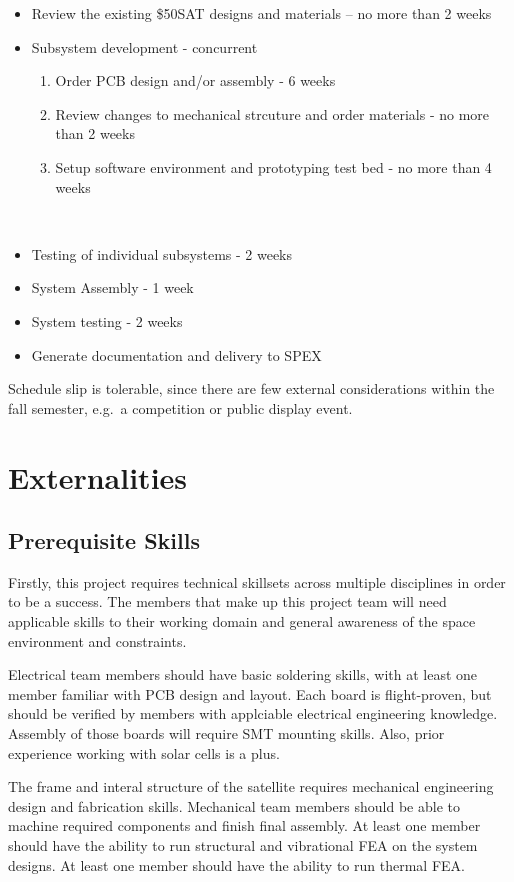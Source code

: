\documentclass[conference]{IEEEtran} %
\begin{document}
\begin{itemize}
  \item Review the existing \$50SAT designs and materials -- no more than 2 weeks
  \item Subsystem development - concurrent
  \begin{enumerate}
    \item Order PCB design and/or assembly - 6 weeks
    \item Review changes to mechanical strcuture and order materials - no more than 2 weeks
    \item Setup software environment and prototyping test bed - no more than 4 weeks
  \end{enumerate}\
  \item Testing of individual subsystems - 2 weeks
  \item System Assembly - 1 week
  \item System testing - 2 weeks
  \item Generate documentation and delivery to SPEX
\end{itemize}

Schedule slip is tolerable, since there are few external considerations within the fall semester, e.g.\ a competition or public display event.
\section{Externalities}
\subsection{Prerequisite Skills}
Firstly, this project requires technical skillsets across multiple disciplines in order to be a success.
The members that make up this project team will need applicable skills to their working domain and general awareness of the space environment and constraints.

Electrical team members should have basic soldering skills, with at least one member familiar with PCB design and layout.
Each board is flight-proven, but should be verified by members with applciable electrical engineering knowledge.
Assembly of those boards will require SMT mounting skills.
Also, prior experience working with solar cells is a plus.

The frame and interal structure of the satellite requires mechanical engineering design and fabrication skills.
Mechanical team members should be able to machine required components and finish final assembly.
At least one member should have the ability to run structural and vibrational FEA on the system designs.
At least one member should have the ability to run thermal FEA.\@
\end{document}
